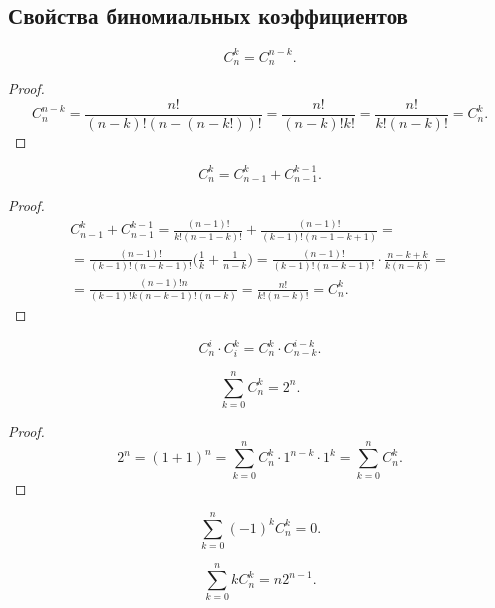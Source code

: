 \subsection{Свойства биномиальных коэффициентов}

\begin{property}
    \[
        C_n^k = C_n^{n - k}.
    \]
    \begin{proof}
        \[
            C_n^{n - k} = \frac{n!}{(n - k)!(n - (n - k!))!} = \frac{n!}{(n - k)! k!} = \frac{n!}{k! (n - k)!} = C_n^k.
        \]
    \end{proof}
\end{property}

\begin{property}
    \[
        C_n^k = C_{n - 1}^k + C_{n - 1}^{k - 1}.
    \]
    \begin{proof}
        \begin{gather*}
            C_{n - 1}^k + C_{n - 1}^{k - 1} =
            \frac{(n - 1)!}{k! (n - 1 - k)!} + \frac{(n - 1)!}{(k - 1)! (n - 1 - k + 1)} = \\ =
            \frac{(n - 1)!}{(k - 1)! (n - k - 1)!} \Big( \frac{1}{k} + \frac{1}{n - k} \Big) =
            \frac{(n - 1)!}{(k - 1)! (n - k - 1)!} \cdot \frac{n - k + k}{k (n - k)} = \\ =
            \frac{(n - 1)! n}{(k - 1)! k (n - k - 1)! (n - k)} =
            \frac{n!}{k! (n - k)!} = C_n^k.
        \end{gather*}
    \end{proof}
\end{property}

\begin{property}
    \[
        C_n^i \cdot C_i^k = C_n^k \cdot C_{n - k}^{i - k}.
    \]
\end{property}

\begin{property}
    \[
        \sum_{k = 0}^n C_n^k = 2^n.
    \]
    \begin{proof}
        \[
            2^n = (1 + 1)^n = \sum_{k = 0}^n C_n^k \cdot 1^{n - k} \cdot 1^k = \sum_{k = 0}^n C_n^k.
        \]
    \end{proof}
\end{property}

\begin{property}
    \[
        \sum_{k = 0}^n (-1)^k C_n^k = 0.
    \]
\end{property}

\begin{property}
    \[
        \sum_{k = 0}^n k C_n^k = n 2^{n - 1}.
    \]
\end{property}

